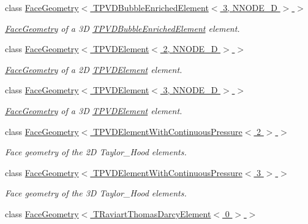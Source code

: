 \begin{DoxyCompactItemize}
class \hyperlink{classoomph_1_1FaceGeometry_3_01TPVDBubbleEnrichedElement_3_013_00_01NNODE__1D_01_4_01_4}{Face\+Geometry$<$ T\+P\+V\+D\+Bubble\+Enriched\+Element$<$ 3, N\+N\+O\+D\+E\+\_\+D $>$ $>$}
\begin{DoxyCompactList}\small\item\em \hyperlink{classoomph_1_1FaceGeometry}{Face\+Geometry} of a 3D \hyperlink{classoomph_1_1TPVDBubbleEnrichedElement}{T\+P\+V\+D\+Bubble\+Enriched\+Element} element. \end{DoxyCompactList}\item 
class \hyperlink{classoomph_1_1FaceGeometry_3_01TPVDElement_3_012_00_01NNODE__1D_01_4_01_4}{Face\+Geometry$<$ T\+P\+V\+D\+Element$<$ 2, N\+N\+O\+D\+E\+\_\+D $>$ $>$}
\begin{DoxyCompactList}\small\item\em \hyperlink{classoomph_1_1FaceGeometry}{Face\+Geometry} of a 2D \hyperlink{classoomph_1_1TPVDElement}{T\+P\+V\+D\+Element} element. \end{DoxyCompactList}\item 
class \hyperlink{classoomph_1_1FaceGeometry_3_01TPVDElement_3_013_00_01NNODE__1D_01_4_01_4}{Face\+Geometry$<$ T\+P\+V\+D\+Element$<$ 3, N\+N\+O\+D\+E\+\_\+D $>$ $>$}
\begin{DoxyCompactList}\small\item\em \hyperlink{classoomph_1_1FaceGeometry}{Face\+Geometry} of a 3D \hyperlink{classoomph_1_1TPVDElement}{T\+P\+V\+D\+Element} element. \end{DoxyCompactList}\item 
class \hyperlink{classoomph_1_1FaceGeometry_3_01TPVDElementWithContinuousPressure_3_012_01_4_01_4}{Face\+Geometry$<$ T\+P\+V\+D\+Element\+With\+Continuous\+Pressure$<$ 2 $>$ $>$}
\begin{DoxyCompactList}\small\item\em Face geometry of the 2D Taylor\+\_\+\+Hood elements. \end{DoxyCompactList}\item 
class \hyperlink{classoomph_1_1FaceGeometry_3_01TPVDElementWithContinuousPressure_3_013_01_4_01_4}{Face\+Geometry$<$ T\+P\+V\+D\+Element\+With\+Continuous\+Pressure$<$ 3 $>$ $>$}
\begin{DoxyCompactList}\small\item\em Face geometry of the 3D Taylor\+\_\+\+Hood elements. \end{DoxyCompactList}\item 
class \hyperlink{classoomph_1_1FaceGeometry_3_01TRaviartThomasDarcyElement_3_010_01_4_01_4}{Face\+Geometry$<$ T\+Raviart\+Thomas\+Darcy\+Element$<$ 0 $>$ $>$}

\end{DoxyCompactItemize}
